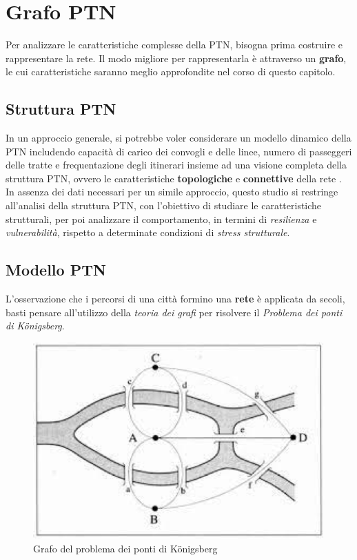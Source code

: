 \chapter{Grafo PTN}
\label{cap2}

Per analizzare le caratteristiche complesse della PTN, bisogna prima costruire e rappresentare la rete. Il modo migliore per rappresentarla è attraverso un \textbf{grafo}, le cui caratteristiche saranno meglio approfondite nel corso di questo capitolo.

\section{Struttura PTN}
In un approccio generale, si potrebbe voler considerare un modello dinamico della PTN includendo capacità di carico dei convogli e delle linee, numero di passeggeri delle tratte e frequentazione degli itinerari insieme ad una visione completa della struttura PTN, ovvero le caratteristiche \textbf{topologiche} e \textbf{connettive} della rete \cite{vonFerber2012LondonParis}. \\
In assenza dei dati necessari per un simile approccio, questo studio si restringe all'analisi della struttura PTN, con l'obiettivo di studiare le caratteristiche strutturali, per poi analizzare il comportamento, in termini di \textit{resilienza} e \textit{vulnerabilità}, rispetto a determinate condizioni di \textit{stress strutturale}.

\section{Modello PTN}
L'osservazione che i percorsi di una città formino una \textbf{rete} è applicata da secoli, basti pensare all'utilizzo della \textit{teoria dei grafi} per risolvere il \textit{Problema dei ponti di Königsberg}.

\vspace{1em}
\begin{figure}[h!]
    \centering
    \includegraphics[width=0.4\linewidth]{Immagini//Capitoli//cap2/ponti.png}
    \caption{Grafo del problema dei ponti di Königsberg}
    \label{fig:Rappresentazione a grafo del problema dei ponti di Königsberg}
\end{figure}
\vspace{1em}

